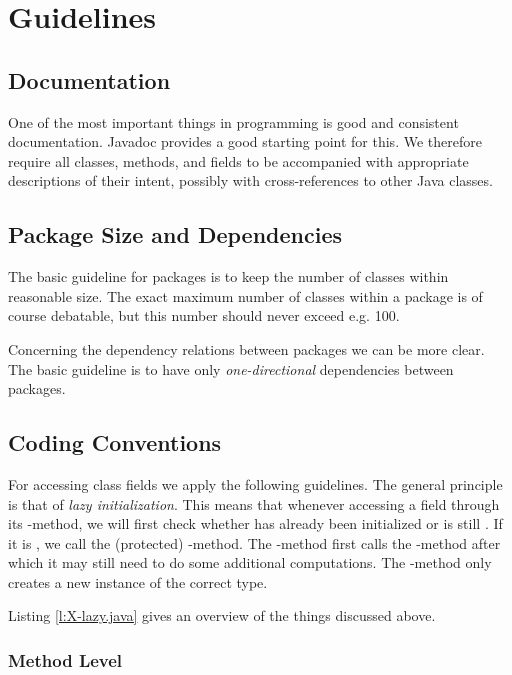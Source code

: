 \chapter{Guidelines}


\section{Documentation}

One of the most important things in programming is good and consistent documentation. Javadoc provides a good starting point for this. We therefore require all classes, methods, and fields to be accompanied with appropriate descriptions of their intent, possibly with cross-references to other Java classes.

\section{Package Size and Dependencies}

The basic guideline for packages is to keep the number of classes within reasonable size. The exact maximum number of classes within a package is of course debatable, but this number should never exceed e.g. 100.

Concerning the dependency relations between packages we can be more clear. The basic guideline is to have only {\em one-directional} dependencies between packages.


\section{Coding Conventions}

For accessing class fields we apply the following guidelines. The general principle is that of {\em lazy initialization}. This means that whenever accessing a field \x through its \getX-method, we will first check whether \x has already been initialized or is still \nullPnt. If it is \nullPnt, we call the (protected) \computeX-method. The \computeX-method first calls the \createX-method after which it may still need to do some additional computations. The \createX-method only creates a new instance of the correct type.

Listing \ref{l:X-lazy.java} gives an overview of the things discussed above.


\subsection{Method Level}

